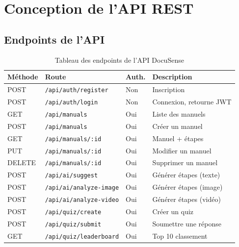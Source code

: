 \documentclass[12pt, a4paper, twoside, openany]{report}
\begin{document}
\section{Conception de l'API REST}

\subsection{Endpoints de l'API}

\begin{table}[H]
  \centering
  \caption{Tableau des endpoints de l'API DocuSense}
  \label{tab:api}
  \renewcommand{\arraystretch}{1.3}
  \begin{tabularx}{\textwidth}{l l l X}
    \toprule
    \textbf{M\'ethode} & \textbf{Route} & \textbf{Auth.}
      & \textbf{Description} \\
    \midrule
    POST   & \texttt{/api/auth/register}          & Non & Inscription \\
    POST   & \texttt{/api/auth/login}              & Non & Connexion, retourne JWT \\
    \midrule
    GET    & \texttt{/api/manuals}                 & Oui & Liste des manuels \\
    POST   & \texttt{/api/manuals}                 & Oui & Cr\'eer un manuel \\
    GET    & \texttt{/api/manuals/:id}             & Oui & Manuel + \'etapes \\
    PUT    & \texttt{/api/manuals/:id}             & Oui & Modifier un manuel \\
    DELETE & \texttt{/api/manuals/:id}             & Oui & Supprimer un manuel \\
    \midrule
    POST   & \texttt{/api/ai/suggest}              & Oui & G\'en\'erer \'etapes (texte) \\
    POST   & \texttt{/api/ai/analyze-image}        & Oui & G\'en\'erer \'etapes (image) \\
    POST   & \texttt{/api/ai/analyze-video}        & Oui & G\'en\'erer \'etapes (vid\'eo) \\
    \midrule
    POST   & \texttt{/api/quiz/create}             & Oui & Cr\'eer un quiz \\
    POST   & \texttt{/api/quiz/submit}             & Oui & Soumettre une r\'eponse \\
    GET    & \texttt{/api/quiz/leaderboard}        & Oui & Top 10 classement \\
    \bottomrule
  \end{tabularx}
\end{table}
\end{document}
